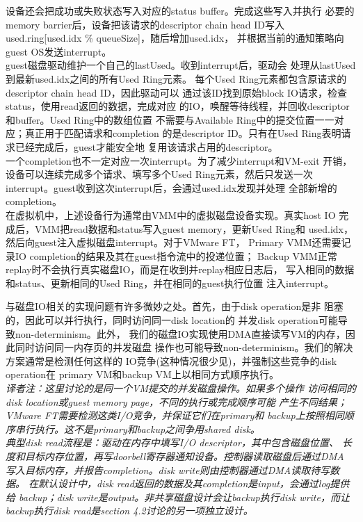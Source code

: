 {设备还会把成功或失败状态写入对应的status buffer。完成这些写入并执行%
必要的memory barrier后，设备把该请求的descriptor chain head ID写入%
used.ring[used.idx \% queueSize]，随后增加used.idx，%
并根据当前的通知策略向guest OS发送interrupt。%
\\guest磁盘驱动维护一个自己的lastUsed。收到interrupt后，驱动会%
处理从lastUsed到最新used.idx之间的所有Used Ring元素。%
每个Used Ring元素都包含原请求的descriptor chain head ID，因此驱动可以%
通过该ID找到原始block IO请求，检查status，使用read返回的数据，完成对应%
的IO，唤醒等待线程，并回收descriptor和buffer。Used Ring中的数组位置%
不需要与Available Ring中的提交位置一一对应；真正用于匹配请求和completion%
的是descriptor ID。只有在Used Ring表明请求已经完成后，guest才能安全地%
复用该请求占用的descriptor。%
\\一个completion也不一定对应一次interrupt。为了减少interrupt和VM-exit%
开销，设备可以连续完成多个请求、填写多个Used Ring元素，然后只发送一次%
interrupt。guest收到这次interrupt后，会通过used.idx发现并处理%
全部新增的completion。%
\\在虚拟机中，上述设备行为通常由VMM中的虚拟磁盘设备实现。真实host IO%
完成后，VMM把read数据和status写入guest memory，更新Used Ring和%
used.idx，然后向guest注入虚拟磁盘interrupt。对于VMware FT，%
Primary VMM还需要记录IO completion的结果及其在guest指令流中的投递位置；%
Backup VMM正常replay时不会执行真实磁盘IO，而是在收到并replay相应日志后，%
写入相同的数据和status、更新相同的Used Ring，并在相同的guest执行位置%
注入interrupt。}%

与磁盘IO相关的实现问题有许多微妙之处。首先，由于disk operation是非%
阻塞的，因此可以并行执行，同时访问同一disk location的%
并发disk operation可能导致non-determinism。此外，%
我们的磁盘IO实现使用DMA直接读写VM的内存，因此同时访问同一内存页的并发磁盘%
操作也可能导致non-determinism。我们的解决方案通常是检测任何这样的%
IO竞争(这种情况很少见)，并强制这些竞争的disk operation在%
primary VM和backup VM上以相同方式顺序执行。%
\\\emph{译者注：这里讨论的是同一个VM提交的并发磁盘操作。如果多个操作%
访问相同的disk location或guest memory page，不同的执行或完成顺序可能%
产生不同结果；VMware FT需要检测这类I/O竞争，并保证它们在primary和%
backup上按照相同顺序串行执行。这不是primary和backup之间争用shared disk。%
\\典型disk read流程是：驱动在内存中填写I/O descriptor，其中包含磁盘位置、%
长度和目标内存位置，再写doorbell寄存器通知设备。控制器读取磁盘后通过DMA%
写入目标内存，并报告completion。disk write则由控制器通过DMA读取待写数据。%
在默认设计中，disk read返回的数据及其completion是input，会通过log提供给%
backup；disk write是output。非共享磁盘设计会让backup执行disk write，而让%
backup执行disk read是section 4.2讨论的另一项独立设计。}%

